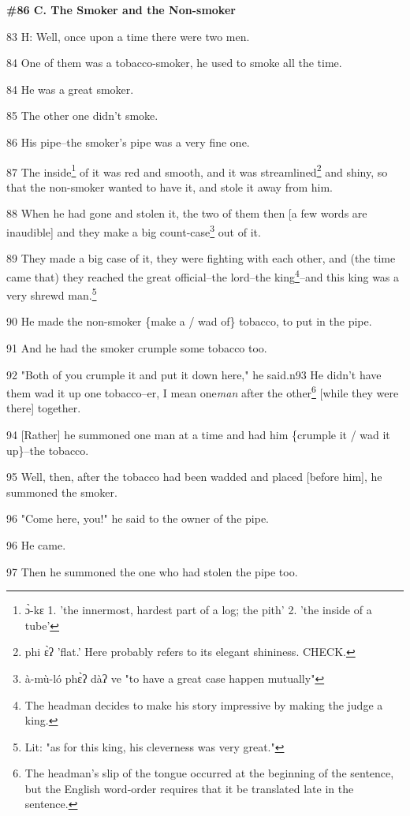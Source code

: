
\textbf{\#86 C. The Smoker and the Non-smoker}

83 H: Well, once upon a time there were two men.

84 One of them was a tobacco-smoker, he used to smoke all the time.

84 He was a great smoker.

85 The other one didn't smoke.

86 His pipe--the smoker's pipe was a very fine one.

87 The inside\footnote{ɔ̀-kɛ 1. 'the innermost, hardest part of a log; the pith' 2. 'the inside of a tube'} of it was red and smooth, and it was streamlined\footnote{phi ɛ̀ʔ 'flat.' Here probably refers to its elegant shininess. CHECK.} and shiny,
so that the non-smoker wanted to have it, and stole it away from him.

88 When he had gone and stolen it, the two of them then [a few words are inaudible]
and they make a big count-case\footnote{à-mù-ló phɛ̀ʔ dàʔ ve "to have a great case happen mutually"} out of it.

89 They made a big case of it, they were fighting with each other, and (the time
came that) they reached the great official--the lord--the king\footnote{The headman decides to make his story impressive by making the judge a king.}--and this king
was a very shrewd man.\footnote{Lit: "as for this king, his cleverness was very great."}

90 He made the non-smoker \{make a / wad of\} tobacco, to put in the pipe.

91 And he had the smoker crumple some tobacco too.

92 "Both of you crumple it and put it down here," he said.n93
He didn't have them wad it up one tobacco--er, I mean one\textit{man} after the
other\footnote{The headman's slip of the tongue occurred at the beginning of the sentence, but the English word-order requires that it be translated late in the sentence.} [while they were there] together.

94 [Rather] he summoned one man at a time and had him \{crumple it / wad it up\}--the
tobacco.

95 Well, then, after the tobacco had been wadded and placed [before him], he summoned
the smoker.

96 "Come here, you!" he said to the owner of the pipe.

96 He came.

97 Then he summoned the one who had stolen the pipe too.

